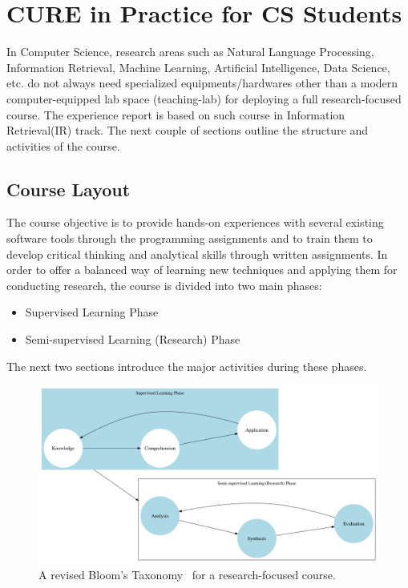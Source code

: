 \documentclass{article}
\begin{document}
\section{CURE in Practice for CS Students}
\label{cureinCS}
 In Computer Science, research areas such as Natural Language Processing, Information Retrieval, Machine Learning, Artificial Intelligence, Data Science, etc. do not always need specialized equipments/hardwares other than a modern computer-equipped lab space (teaching-lab) for deploying a full research-focused course. The experience report is based on such course in Information Retrieval(IR) track. The next couple of sections outline the structure and activities of the course.

\subsection{Course Layout}
The course objective is to provide hands-on experiences with several existing software tools through the programming assignments and to train them to develop critical thinking and analytical skills through written assignments. In order to offer a balanced way of learning new techniques and applying them for conducting research, the course is divided into two main phases: 
\begin{itemize}
\item Supervised Learning Phase
\item Semi-supervised Learning (Research) Phase
\end{itemize}
The next two sections introduce the major activities during these phases.

\begin{figure}[h]
\centering
\includegraphics[width=.75\textwidth]{./figures/graph2}
\caption{A revised Bloom's Taxonomy~\cite{adams2015bloom} for a research-focused course.} \label{fig1}
\end{figure}
\end{document}
